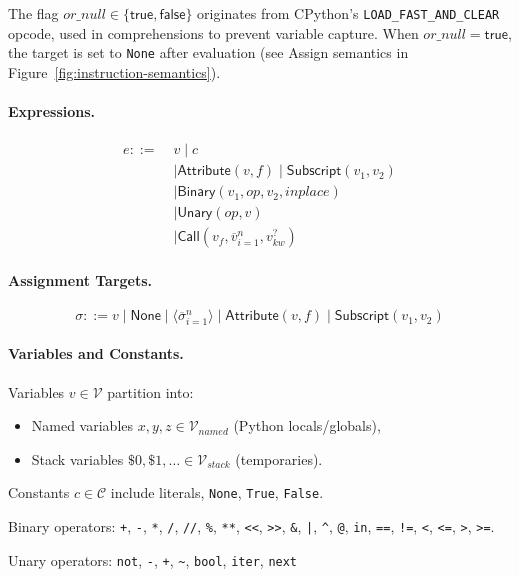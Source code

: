 The flag $\mathit{or\_null} \in \{\mathsf{true},\mathsf{false}\}$ originates from CPython's \texttt{LOAD\_FAST\_AND\_CLEAR} opcode, used in comprehensions to prevent variable capture. When $\mathit{or\_null} = \mathsf{true}$, the target is set to \texttt{None} after evaluation (see Assign semantics in Figure~\ref{fig:instruction-semantics}).

\paragraph{Expressions.}
\[
\begin{aligned}
e ::= \;& v \mid c \\
 &\mid \mathsf{Attribute}(v,f) \mid \mathsf{Subscript}(v_1,v_2) \\
 &\mid \mathsf{Binary}(v_1,op,v_2,inplace) \\
 &\mid \mathsf{Unary}(op,v) \\
 &\mid \mathsf{Call}(v_f, \overline{v}_{i=1}^{n}, v_{kw}^{?})
\end{aligned}
\]

\paragraph{Assignment Targets.}
\[
\sigma ::= v \mid \mathsf{None} \mid \langle\overline{\sigma}_{i=1}^{n}\rangle \mid \mathsf{Attribute}(v,f) \mid \mathsf{Subscript}(v_1,v_2)
\]

\paragraph{Variables and Constants.}
Variables $v \in \mathcal{V}$ partition into:
\begin{itemize}
\item Named variables $x,y,z \in \mathcal{V}_{\mathit{named}}$ (Python locals/globals),
\item Stack variables $\$0,\$1,\ldots \in \mathcal{V}_{\mathit{stack}}$ (temporaries).
\end{itemize}

Constants $c \in \mathcal{C}$ include literals, \texttt{None}, \texttt{True}, \texttt{False}.

Binary operators: \texttt{+}, \texttt{-}, \texttt{*}, \texttt{/}, \texttt{//}, \texttt{\%}, \texttt{**}, \texttt{<<}, \texttt{>>}, \texttt{\&}, \texttt{|}, \texttt{\^}, \texttt{@}, \texttt{in}, \texttt{==}, \texttt{!=}, \texttt{<}, \texttt{<=}, \texttt{>}, \texttt{>=}.

Unary operators: \texttt{not}, \texttt{-}, \texttt{+}, \texttt{\~}, \texttt{bool}, \texttt{iter}, \texttt{next}

